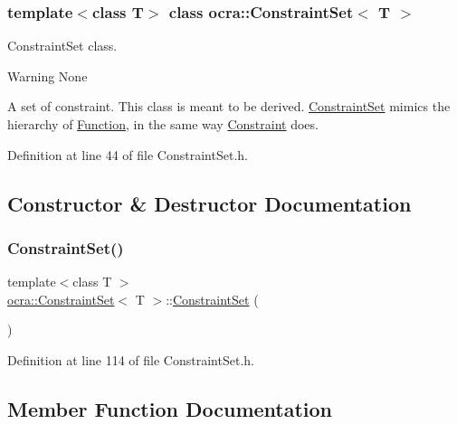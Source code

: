 \subsubsection*{template$<$class T$>$\newline
class ocra\+::\+Constraint\+Set$<$ T $>$}

Constraint\+Set class. 

\begin{DoxyWarning}{Warning}
None
\end{DoxyWarning}
A set of constraint. This class is meant to be derived. \hyperlink{classocra_1_1ConstraintSet}{Constraint\+Set} mimics the hierarchy of \hyperlink{classocra_1_1Function}{Function}, in the same way \hyperlink{classocra_1_1Constraint}{Constraint} does. 

Definition at line 44 of file Constraint\+Set.\+h.



\subsection{Constructor \& Destructor Documentation}
\hypertarget{classocra_1_1ConstraintSet_ae571e7cc71dd7a2cfd3e8eeac028f65c}{}\label{classocra_1_1ConstraintSet_ae571e7cc71dd7a2cfd3e8eeac028f65c} 
\subsubsection{\texorpdfstring{Constraint\+Set()}{ConstraintSet()}}
{\footnotesize\ttfamily template$<$class T $>$ \\
\hyperlink{classocra_1_1ConstraintSet}{ocra\+::\+Constraint\+Set}$<$ T $>$\+::\hyperlink{classocra_1_1ConstraintSet}{Constraint\+Set} (\begin{DoxyParamCaption}{ }\end{DoxyParamCaption})\hspace{0.3cm}{\ttfamily [inline]}}



Definition at line 114 of file Constraint\+Set.\+h.



\subsection{Member Function Documentation}
\hypertarget{classocra_1_1ConstraintSet_a56204ca335c5e235629cfbc8d68397ac}{}\label{classocra_1_1ConstraintSet_a56204ca335c5e235629cfbc8d68397ac} 
